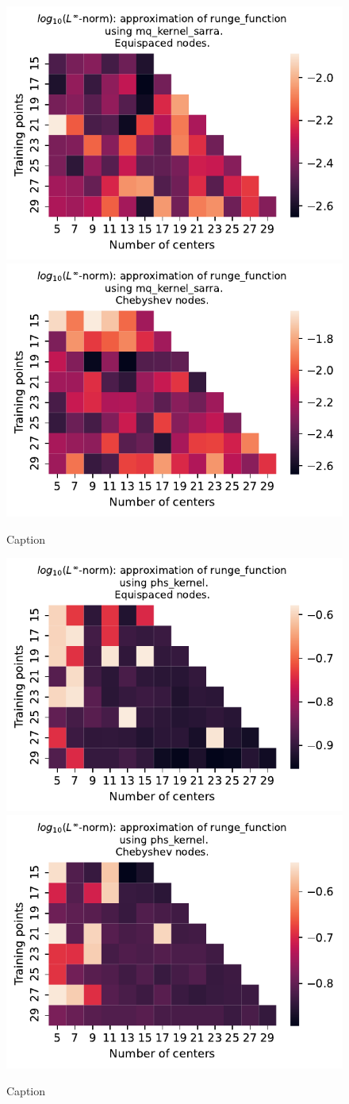 \documentclass[12pt]{report} %
\begin{document}
\begin{figure}[ht]
  \centering

  \includegraphics[width=.49\textwidth]{imagenes/experiments/1d/variational/runge_function-Kmq_kernel_sarra-Equi.pdf}
  \includegraphics[width=.49\textwidth]{imagenes/experiments/1d/variational/runge_function-Kmq_kernel_sarra-Cheb.pdf}
  \caption{Caption}
  \label{fig:runge-sarra}
\end{figure}


\begin{figure}[ht]
  \centering

  \includegraphics[width=.49\textwidth]{imagenes/experiments/1d/variational/runge_function-Kphs_kernel-Equi.pdf}
  \includegraphics[width=.49\textwidth]{imagenes/experiments/1d/variational/runge_function-Kphs_kernel-Cheb.pdf}
  \caption{Caption}
  \label{fig:runge-phs}
\end{figure}
\end{document}
